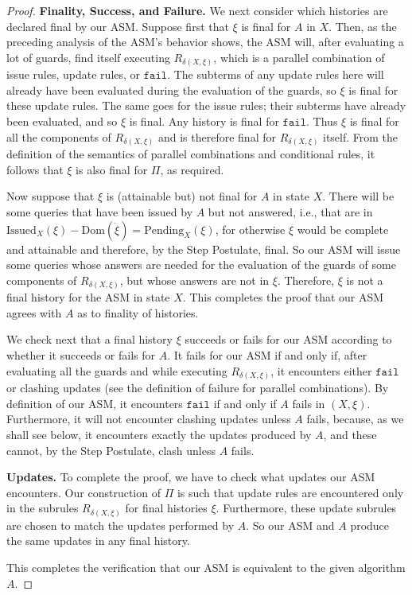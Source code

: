 \documentclass{LMCS}
\theoremstyle{definition}
\newcommand{\Issued}{\text{Issued}}
\newcommand{\ans}{\dot}
\newcommand{\dom}[1]{\ensuremath{{\text{Dom}}(#1)}}
\newcommand{\ttt}[1]{\ensuremath{\mathtt {#1}}}
\begin{document}
\begin{proof}
\medskip\noindent\textbf{Finality, Success, and Failure.}
We next consider which histories are declared final by our ASM.
Suppose first that $\xi$ is final for $A$ in $X$.  Then, as the
preceding analysis of the ASM's behavior shows, the ASM will,
after evaluating a lot of guards, find itself executing
$R_{\delta(X,\xi)}$, which is a parallel combination of issue
rules, update rules, or \ttt{fail}.  The subterms of any update
rules here will already have been evaluated during the evaluation
of the guards, so $\xi$ is final for these update rules.  The same
goes for the issue rules; their subterms have already been
evaluated, and so $\xi$ is final.  Any history is final for
\ttt{fail}.  Thus $\xi$ is final for all the components of
$R_{\delta(X,\xi)}$ and is therefore final for $R_{\delta(X,\xi)}$
itself.  From the definition of the semantics of parallel combinations
and conditional rules, it follows that $\xi$ is also final for $\Pi$,
as required.

Now suppose that $\xi$ is (attainable but) not final for $A$ in
state $X$.  There will be some queries that have been issued by
$A$ but not answered, i.e., that are in
$\Issued_X(\xi)-\dom{\ans\xi}=\text{Pending}_X(\xi)$, for otherwise
$\xi$ would be complete and attainable and therefore, by the Step
Postulate, final.  So our ASM will issue some queries whose
answers are needed for the evaluation of the guards of some
components of $R_{\delta(X,\xi)}$, but whose answers are not in
$\xi$.  Therefore, $\xi$ is not a final history for the ASM in
state $X$.  This completes the proof that our ASM agrees with $A$
as to finality of histories.


We check next that a final history $\xi$ succeeds or fails for our
ASM according to whether it succeeds or fails for $A$. It fails
for our ASM if and only if, after evaluating all the guards and
while executing $R_{\delta(X,\xi)}$, it encounters either
\ttt{fail} or clashing updates (see the definition of failure for
parallel combinations).  By definition of our ASM, it encounters
\ttt{fail} if and only if $A$ fails in $(X,\xi)$. Furthermore, it
will not encounter clashing updates unless $A$ fails, because, as
we shall see below, it encounters exactly the updates produced by
$A$, and these cannot, by the Step Postulate, clash unless $A$
fails.

\medskip\noindent\textbf{Updates.} To complete the proof, we have to
 check what updates our ASM encounters.  Our
construction of $\Pi$ is such that update rules are encountered
only in the subrules $R_{\delta(X,\xi)}$ for final histories
$\xi$. Furthermore, these update subrules are chosen to match the
updates performed by $A$.  So our ASM and $A$ produce the same
updates in any final history.

This completes the verification that our ASM is equivalent to the
given algorithm $A$.
\end{proof}
\end{document}
